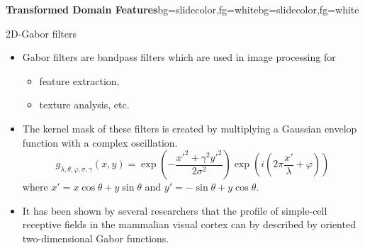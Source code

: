 \begin{frame}{}
\begin{variableblock}{\centering \Large \textbf{\vspace{4pt}\newline Transformed Domain Features\vspace{4pt}}}{bg=slidecolor,fg=white}{bg=slidecolor,fg=white}
\end{variableblock}
\end{frame}


\begin{frame}{2D-Gabor filters}
\begin{itemize}
\item Gabor filters are bandpass filters which are used in image processing for
\begin{itemize}
\item feature extraction,
\item texture analysis, etc.
\end{itemize}   
\item The kernel  mask of these filters is created by multiplying a Gaussian envelop function with a complex oscillation.
\begin{equation}
{g_{\lambda ,\theta ,\varphi ,\sigma ,\gamma }}(x,y) = \exp \left( { - \frac{{x{'^2} + {\gamma ^2}y{'^2}}}{{2{\sigma ^2}}}} \right)\exp \left( i\left({2\pi \frac{{x'}}{\lambda } + \varphi }\right) \right)\nonumber
\end{equation}
where $x'=x\cos\theta+y\sin \theta$ and $y'=-\sin \theta+y\cos \theta$.
\item It has been shown by several researchers that the profile of simple-cell receptive fields in the mammalian visual cortex can by described by oriented two-dimensional Gabor functions.
\end{itemize}
\end{frame}

